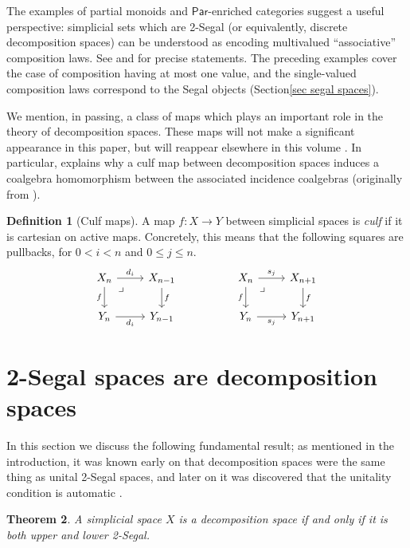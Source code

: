 \documentclass{amsart}
\newtheorem{theorem}{Theorem}[section]
\theoremstyle{definition}
\newtheorem{definition}[theorem]{Definition}
\theoremstyle{remark}
\newcommand{\catpar}{\mathsf{Par}}
\begin{document}
The examples of partial monoids and $\catpar$-enriched categories suggest a useful perspective: simplicial sets which are 2-Segal (or equivalently, discrete decomposition spaces) can be understood as encoding multivalued ``associative'' composition laws.
See \cite[\S3.3]{DyckerhoffKapranov:HSS} and \cite{Stern:BIRS} for precise statements.
The preceding examples cover the case of composition having at most one value, and the single-valued composition laws correspond to the Segal objects (Section\nobreakspace \ref {sec segal spaces}).

We mention, in passing, a class of maps which plays an important role in the theory of decomposition spaces.
These maps will not make a significant appearance in this paper, but will reappear elsewhere in this volume \cite{CooperYoung:BIRS,GKT:DSC}.
In particular, \cite{CooperYoung:BIRS} explains why a culf map between decomposition spaces induces a coalgebra homomorphism between the associated incidence coalgebras (originally from \cite[Lemma 8.2]{GKT1}).

\begin{definition}[Culf maps]\label{def culf}
A map $f \colon X \to Y$ between simplicial spaces is \emph{culf} if it is cartesian on active maps.
Concretely, this means that the following squares are pullbacks, for $0 < i < n$ and $0\leq j \leq n$.
\[ \begin{tikzcd}
X_n \rar{d_i} \dar[swap]{f} \ar[dr, phantom, "\lrcorner" very near start]  & X_{n-1} \dar{f} 
& &
X_n \rar{s_j} \dar[swap]{f} \ar[dr, phantom, "\lrcorner" very near start]  & X_{n+1} \dar{f} 
\\
Y_n  \rar[swap]{d_i} & Y_{n-1} 
& &
Y_n  \rar[swap]{s_j} & Y_{n+1}
\end{tikzcd}
\]
\end{definition}

\section{2-Segal spaces are decomposition spaces}\label{sec 2-Segl decomp}

In this section we discuss the following fundamental result; as mentioned in the introduction, it was known early on that decomposition spaces were the same thing as unital 2-Segal spaces, and later on it was discovered that the unitality condition is automatic \cite{Feller_et_al:E2SSU}.

\begin{theorem}\label{thm unitality} 
A simplicial space $X$ is a decomposition space if and only if it is both upper and lower 2-Segal.
\end{theorem}
\end{document}
